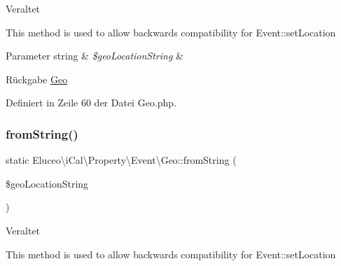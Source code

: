 \begin{DoxyRefDesc}{Veraltet}
\item[\mbox{\hyperlink{deprecated__deprecated000007}{Veraltet}}]This method is used to allow backwards compatibility for Event\+::set\+Location\end{DoxyRefDesc}



\begin{DoxyParams}[1]{Parameter}
string & {\em \$geo\+Location\+String} & \\
\hline
\end{DoxyParams}
\begin{DoxyReturn}{Rückgabe}
\mbox{\hyperlink{class_eluceo_1_1i_cal_1_1_property_1_1_event_1_1_geo}{Geo}} 
\end{DoxyReturn}


Definiert in Zeile 60 der Datei Geo.\+php.

\mbox{\label{class_eluceo_1_1i_cal_1_1_property_1_1_event_1_1_geo_a8610d5433703bb05b2f1e48a44b93a81}} 
\subsubsection{\texorpdfstring{from\+String()}{fromString()}\hspace{0.1cm}{\footnotesize\ttfamily [2/3]}}
{\footnotesize\ttfamily static Eluceo\textbackslash{}i\+Cal\textbackslash{}\+Property\textbackslash{}\+Event\textbackslash{}\+Geo\+::from\+String (\begin{DoxyParamCaption}\item[{string}]{\$geo\+Location\+String }\end{DoxyParamCaption})\hspace{0.3cm}{\ttfamily [static]}}

\begin{DoxyRefDesc}{Veraltet}
\item[\mbox{\hyperlink{deprecated__deprecated000029}{Veraltet}}]This method is used to allow backwards compatibility for Event\+::set\+Location\end{DoxyRefDesc}



